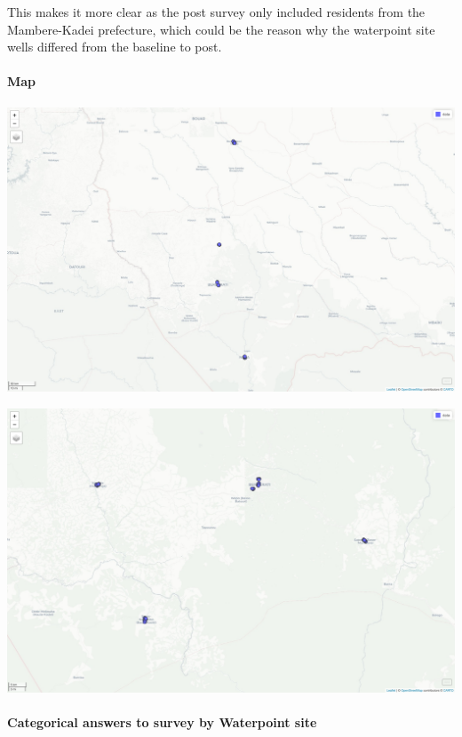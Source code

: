 \documentclass[
  letterpaper,
  DIV=11,
  numbers=noendperiod]{scrartcl}
\let\oldparagraph\paragraph
\renewcommand{\paragraph}[1]{\oldparagraph{#1}\mbox{}}
\begin{document}
This makes it more clear as the post survey only included residents from
the Mambere-Kadei prefecture, which could be the reason why the
waterpoint site wells differed from the baseline to post.

\hypertarget{map}{%
\paragraph{Map}\label{map}}

\includegraphics{report_files/figure-pdf/unnamed-chunk-30-1.pdf}

\includegraphics{report_files/figure-pdf/unnamed-chunk-30-2.pdf}

\hypertarget{categorical-answers-to-survey-by-waterpoint-site}{%
\paragraph{Categorical answers to survey by Waterpoint
site}\label{categorical-answers-to-survey-by-waterpoint-site}}
\end{document}
